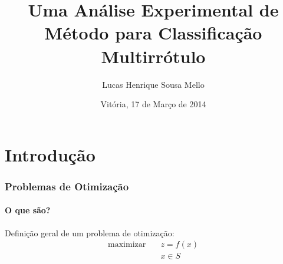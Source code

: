\documentclass[10pt,fleqn]{beamer}
\title[]{Uma Análise Experimental de Método para Classificação Multirrótulo}
\subtitle{}
\author{Lucas Henrique Sousa Mello}
\institute[NINFA]{}
\date[Vitória, 17/03/2014]{Vitória, 17 de Março de 2014}
\newcommand{\litem}[1]{
  \item{#1 \vspace{9pt}}
}
\begin{document}





\begin{frame}
  \titlepage
\end{frame}


\section{Introdução}

\begin{frame}
  \frametitle{Problemas de Otimização}
  \framesubtitle{O que são?}
  Definição geral de um problema de otimização:
  \vspace{10pt}
  \begin{align}
    \textrm{maximizar}
      \quad & z = f(x) \nonumber \\
  	  \quad & x \in S \nonumber \\
	  \nonumber
  \end{align}
\end{frame}

\end{document}
